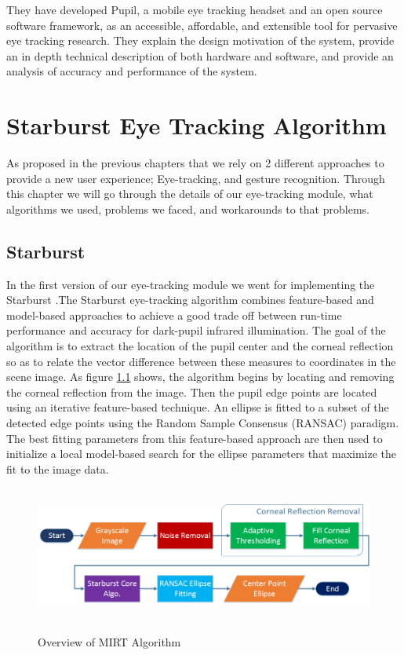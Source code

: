 \documentclass[12pt,fleqn]{book} %
\begin{document}
They have developed Pupil, a mobile eye tracking headset and an open source software framework, as an accessible, affordable, and extensible tool for pervasive eye tracking research. They explain the design motivation of the system, provide an in depth technical description of both hardware and software, and provide an analysis of accuracy and performance of the system.


\chapter{Starburst Eye Tracking Algorithm}
As proposed in the previous chapters that we rely on 2 different approaches to provide a new user experience; Eye-tracking, and gesture recognition. Through this chapter we will go through the details of our eye-tracking module, what algorithms we used, problems we faced, and workarounds to that problems.

\section{Starburst}
In the first version of our eye-tracking module we went for implementing the Starburst \cite{starburst}.The Starburst eye-tracking algorithm combines feature-based and model-based approaches to achieve a good trade off between run-time performance and accuracy for dark-pupil infrared illumination. The goal of the algorithm is to extract the location of the pupil center and the corneal reflection so as to relate the vector difference between these measures to coordinates in the scene image. As figure \ref{fig:starburst_overview} shows, the algorithm begins by locating and removing the corneal reflection from the image. Then the pupil edge points are located using an iterative feature-based technique. An ellipse is fitted to a subset of the detected edge points using the Random Sample Consensus (RANSAC) paradigm. The best fitting parameters from this feature-based approach are then used to initialize a local model-based search for the ellipse  parameters that maximize the fit to the image data.


\begin{figure}[h]
\begin{dBox}
\centering
	\mbox{
		\includegraphics[width=\textwidth]{./Pictures/Starburst_overview.png}
	}
   \caption{Overview of MIRT Algorithm \label{fig:starburst_overview} }   
\end{dBox}   
\end{figure}
\end{document}
